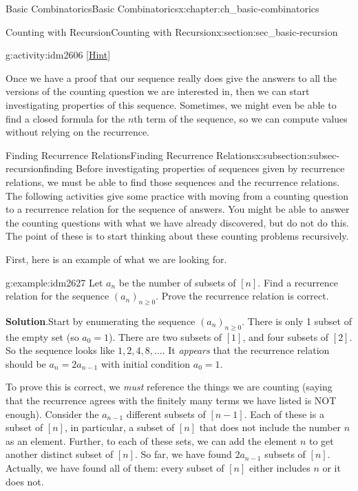 \documentclass[oneside,10pt,]{book}
\numberwithin{equation}{chapter}
\begin{document}
\begin{chapterptx}{Basic Combinatorics}{}{Basic Combinatorics}{}{}{x:chapter:ch_basic-combinatorics}
\begin{sectionptx}{Counting with Recursion}{}{Counting with Recursion}{}{}{x:section:sec_basic-recursion}
\begin{introduction}{}
\begin{activity}{}{g:activity:idm2606}
\space\hspace*{0pt}\hfill{\tiny\hyperlink{g:hint:idm2618-back}{[Hint]}}\end{activity}
Once we have a proof that our sequence really does give the answers to all the versions of the counting question we are interested in, then  we can start investigating properties of this sequence.  Sometimes, we might even be able to find a closed formula for the \(n\)th term of the sequence, so we can compute values without relying on the recurrence.%
\end{introduction}%
%
%
\typeout{************************************************}
\typeout{************************************************}
%
\begin{subsectionptx}{Finding Recurrence Relations}{}{Finding Recurrence Relations}{}{}{x:subsection:subsec-recursionfinding}
Before investigating properties of sequences given by recurrence relations, we must be able to find those sequences and the recurrence relations.  The following activities give some practice with moving from a counting question to a recurrence relation for the sequence of answers.  You might be able to answer the counting questions with what we have already discovered, but do not do this.  The point of these is to start thinking about these counting problems recursively.%
\par
First, here is an example of what we are looking for.%
\begin{example}{}{g:example:idm2627}%
Let \(a_n\) be the number of subsets of \([n]\).  Find a recurrence relation for the sequence \((a_n)_{n \ge 0}\).  Prove the recurrence relation is correct.%
\par\smallskip%
\noindent\textbf{Solution}.\hypertarget{g:solution:idm2633}{}\quad{}Start by enumerating the sequence \((a_n)_{n \ge 0}\).  There is only 1 subset of the empty set (so \(a_0 = 1\)).  There are two subsets of \([1]\), and four subsets of \([2]\).  So the sequence looks like \(1, 2, 4, 8, \ldots\).  It \emph{appears} that the recurrence relation should be \(a_n = 2a_{n-1}\) with initial condition \(a_0 = 1\).%
\par
To prove this is correct, we \emph{must} reference the things we are counting (saying that the recurrence agrees with the finitely many terms we have listed is NOT enough).  Consider the \(a_{n-1}\) different subsets of \([n-1]\).  Each of these is a subset of \([n]\), in particular, a subset of \([n]\) that does not include the number \(n\) as an element.  Further, to each of these sets, we can add the element \(n\) to get another distinct subset of \([n]\).  So far, we have found \(2a_{n-1}\) subsets of \([n]\).  Actually, we have found all of them: every subset of \([n]\) either includes \(n\) or it does not.%

\end{example}
\end{subsectionptx}
\end{sectionptx}
\end{chapterptx}
\end{document}
